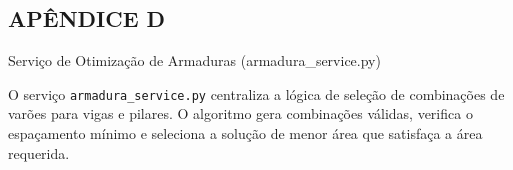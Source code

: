 \newpage
{}
\begin{center}
\section*{APÊNDICE D}
Serviço de Otimização de Armaduras (armadura\_service.py)
\end{center}

O serviço \texttt{armadura\_service.py} centraliza a lógica de seleção de combinações de varões para vigas e pilares. O algoritmo gera combinações válidas, verifica o espaçamento mínimo e seleciona a solução de menor área que satisfaça a área requerida.

